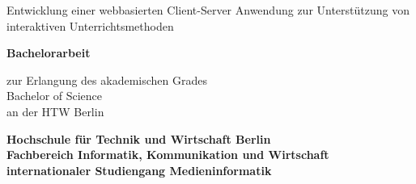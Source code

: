 \documentclass[12pt,a4paper,bibtotoc,pointlessnumbers]{scrartcl}
\begin{document}
	\begin{titlepage}
		\begin{center}
			
			
			 
			\begin{doublespace}
			{\huge Entwicklung einer webbasierten Client-Server Anwendung zur Unterstützung von interaktiven Unterrichtsmethoden}\\
			\end{doublespace}
			\vspace{2cm}
			{\huge \bf Bachelorarbeit}\\
			\vspace{0.4cm}
			
			{\large zur Erlangung des akademischen Grades\\ Bachelor of Science \\ an der HTW Berlin}\\
			
			\vspace{1cm}
			
			{\Large \bf Hochschule für Technik und Wirtschaft Berlin}\\
			{\large \bf Fachbereich Informatik, Kommunikation und Wirtschaft\\
			internationaler	Studiengang Medieninformatik}\\
		
			\vspace{1.5cm}
			

\end{center}
\end{titlepage}
\end{document}

